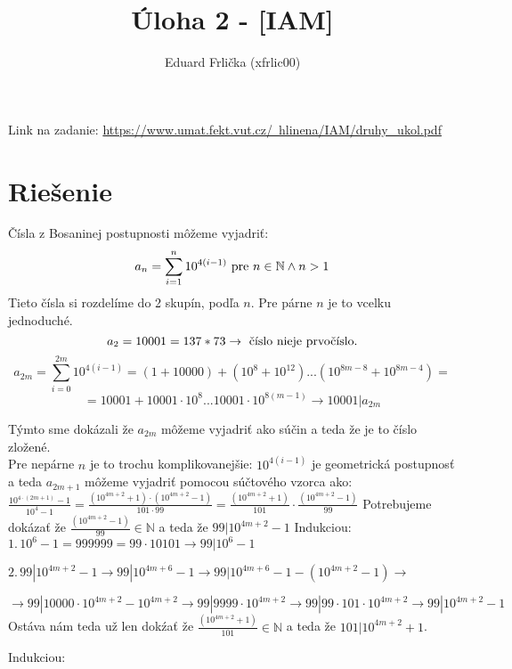 \documentclass[11pt]{article}
\title{Úloha 2 - [IAM]}
\author{Eduard Frlička (xfrlic00)}
\date
\begin{document}
\maketitle

Link na zadanie: \href{https://www.umat.fekt.vut.cz/~hlinena/IAM/druhy_ukol.pdf}{https://www.umat.fekt.vut.cz/~hlinena/IAM/druhy\_ukol.pdf}

\section*{Riešenie}
Čísla z Bosaninej postupnosti môžeme vyjadriť:
$$ a_{n} = \sum^{n}_{i=1}10^{4(i-1)} \textnormal{ pre } n \in \mathbb{N} \wedge n > 1$$
Tieto čísla si rozdelíme do 2 skupín, podľa $n$. 
Pre párne $n$ je to vcelku jednoduché. 
$$a_2 = 10001 = 137*73 \rightarrow \textnormal{ číslo nieje prvočíslo.}$$
$$a_{2m} = \sum^{2m}_{i=0}10^{4(i-1)} = (1 + 10000) + (10^8 + 10^{12}) ... (10^{8m-8} + 10^{8m-4}) = $$ 
$$ = 10001 + 10001 \cdot 10^8 ... 10001 \cdot 10^{8(m-1)} \rightarrow 10001 | a_{2m}$$

Týmto sme dokázali že $a_{2m}$ môžeme vyjadriť ako súčin a teda že je to číslo zložené. \\

Pre nepárne $n$ je to trochu komplikovanejšie:
$10^{4(i-1)}$ je geometrická postupnosť a teda $a_{2m+1} $ môžeme vyjadriť pomocou súčtového vzorca ako: 
$ \frac{10^{4\cdot(2m+1)}-1}{10^4-1} = \frac{(10^{4m+2}+1)\cdot(10^{4m+2}-1)}{101 \cdot 99} = \frac{(10^{4m+2}+1)}{101} \cdot \frac{(10^{4m+2}-1)}{99}$
Potrebujeme dokázať že $\frac{(10^{4m+2}-1)}{99}\in \mathbb{N}$ a teda že $99 | 10^{4m+2} -1$
Indukciou: \\

\noindent
$1. \, 10^6-1=999999 = 99 \cdot 10101 \rightarrow 99 | 10^6-1$

\noindent
$2. \, 99 | 10^{4m+2} -1 \rightarrow 99 | 10^{4m+6} -1 \rightarrow 99 | 10^{4m+6} -1 - (10^{4m+2} -1) \rightarrow$

$ \rightarrow 99 | 10000 \cdot 10^{4m+2} - 10^{4m+2} \rightarrow 99 | 9999 \cdot 10^{4m+2} \rightarrow 99 | 99 \cdot 101 \cdot 10^{4m+2} \rightarrow 99 | 10^{4m+2}-1$ \\

Ostáva nám teda už len dokźať že $\frac{(10^{4m+2}+1)}{101} \in \mathbb{N}$ a teda že $101 | 10^{4m+2}+1$.

Indukciou: \\
\end{document}
